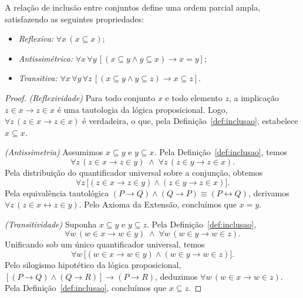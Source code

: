 \begin{teorema}
\label{teo:propriedades-inclusao}
A relação de inclusão entre conjuntos define uma ordem parcial ampla, satisfazendo as seguintes propriedades:
\begin{itemize}
    \item \textit{Reflexiva:} $\forall x\, (x \subseteq x)$;
    \item \textit{Antissimétrica:} $\forall x\, \forall y\, [(x \subseteq y \land y \subseteq x) \rightarrow x = y]$;
    \item \textit{Transitiva:} $\forall x\, \forall y\, \forall z\, [(x \subseteq y \land y \subseteq z) \rightarrow x \subseteq z]$.
\end{itemize}
\end{teorema}

\begin{proof}
\noindent\textit{(Reflexividade)} Para todo conjunto $x$ e todo elemento $z$, a implicação $z \in x \rightarrow z \in x$ é uma tautologia da lógica proposicional. Logo, $\forall z\, (z \in x \rightarrow z \in x)$ é verdadeira, o que, pela Definição~\ref{def:inclusao}, estabelece $x \subseteq x$.

\medskip
\noindent\textit{(Antissimetria)} Assumimos $x \subseteq y$ e $y \subseteq x$. Pela Definição~\ref{def:inclusao}, temos
\begin{equation*}
    \forall z\, (z \in x \rightarrow z \in y)
    \;\land\;
    \forall z\, (z \in y \rightarrow z \in x).
\end{equation*}
Pela distribuição do quantificador universal sobre a conjunção, obtemos
\begin{equation*}
    \forall z\, \bigl[(z \in x \rightarrow z \in y)
        \land (z \in y \rightarrow z \in x)\bigr].
\end{equation*}
Pela equivalência tautológica $(P \rightarrow Q) \land (Q \rightarrow P) \equiv (P \leftrightarrow Q)$, derivamos $\forall z\, (z \in x \leftrightarrow z \in y)$. Pelo Axioma da Extensão, concluímos que $x = y$.

\medskip
\noindent\textit{(Transitividade)} Suponha $x \subseteq y$ e $y \subseteq z$. Pela Definição~\ref{def:inclusao},
\begin{equation*}
    \forall w\, (w \in x \rightarrow w \in y)
    \;\land\;
    \forall w\, (w \in y \rightarrow w \in z).
\end{equation*}
Unificando sob um único quantificador universal, temos
\begin{equation*}
    \forall w\, \bigl[(w \in x \rightarrow w \in y)
        \land (w \in y \rightarrow w \in z)\bigr].
\end{equation*}
Pelo silogismo hipotético da lógica proposicional, $[(P \rightarrow Q) \land (Q \rightarrow R)] \rightarrow (P \rightarrow R)$, deduzimos $\forall w\, (w \in x \rightarrow w \in z)$. Pela Definição~\ref{def:inclusao}, concluímos que $x \subseteq z$.
\end{proof}

